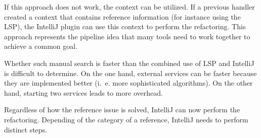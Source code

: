 If this approach does not work, the context can be utilized. If a previous handler created a context that contains reference information (for instance using the \ac{LSP}), the IntelliJ plugin can use this context to perform the refactoring. This approach represents the pipeline idea that many tools need to work together to achieve a common goal.


Whether such manual search is faster than the combined use of \ac{LSP} and IntelliJ is difficult to determine. On the one hand,  external services can be faster because they are implemented better (i.~e. more sophisticated algorithms). On the other hand, starting two services leads to more overhead. 



Regardless of how the reference issue is solved, IntelliJ can now perform the refactoring. Depending of the category of a reference, IntelliJ needs to perform distinct steps. 
